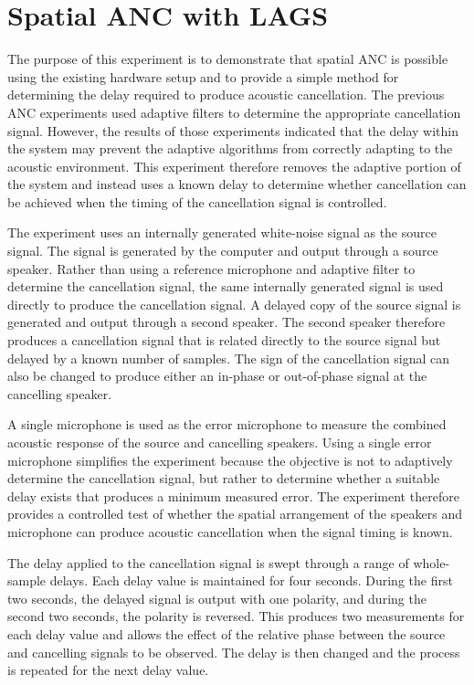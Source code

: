 \section{Spatial ANC with LAGS}

The purpose of this experiment is to demonstrate that spatial ANC is possible using the existing hardware setup and to provide a simple method for determining the delay required to produce acoustic cancellation. The previous ANC experiments used adaptive filters to determine the appropriate cancellation signal. However, the results of those experiments indicated that the delay within the system may prevent the adaptive algorithms from correctly adapting to the acoustic environment. This experiment therefore removes the adaptive portion of the system and instead uses a known delay to determine whether cancellation can be achieved when the timing of the cancellation signal is controlled.

The experiment uses an internally generated white-noise signal as the source signal. The signal is generated by the computer and output through a source speaker. Rather than using a reference microphone and adaptive filter to determine the cancellation signal, the same internally generated signal is used directly to produce the cancellation signal. A delayed copy of the source signal is generated and output through a second speaker. The second speaker therefore produces a cancellation signal that is related directly to the source signal but delayed by a known number of samples. The sign of the cancellation signal can also be changed to produce either an in-phase or out-of-phase signal at the cancelling speaker.

A single microphone is used as the error microphone to measure the combined acoustic response of the source and cancelling speakers. Using a single error microphone simplifies the experiment because the objective is not to adaptively determine the cancellation signal, but rather to determine whether a suitable delay exists that produces a minimum measured error. The experiment therefore provides a controlled test of whether the spatial arrangement of the speakers and microphone can produce acoustic cancellation when the signal timing is known.

The delay applied to the cancellation signal is swept through a range of whole-sample delays. Each delay value is maintained for four seconds. During the first two seconds, the delayed signal is output with one polarity, and during the second two seconds, the polarity is reversed. This produces two measurements for each delay value and allows the effect of the relative phase between the source and cancelling signals to be observed. The delay is then changed and the process is repeated for the next delay value.

